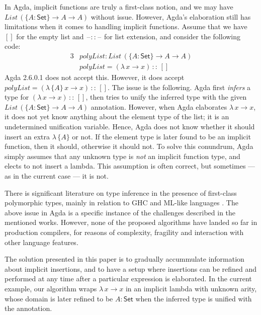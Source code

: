 \documentclass[acmsmall,review,anonymous,prologue,dvipsnames]{acmart}\settopmatter{printfolios=true,printccs=false,printacmref=false}
\newcommand{\blank}{\mathord{\hspace{1pt}\text{--}\hspace{1pt}}}
\newcommand{\kw}[1]{{\mathsf{#1}}}
\theoremstyle{remark}
\begin{document}
In Agda, implicit functions are truly a first-class notion, and we may have
$List\,(\{A : \kw{Set}\}\to A \to A)$ without issue. However, Agda's elaboration
still has limitations when it comes to handling implicit functions. Assume that
we have $[]$ for the empty list and $\blank::\blank$ for list extension,
and consider the following code:
\begin{alignat*}{3}
  & polyList : List\,(\{A : \kw{Set}\}\to A \to A)\\
  & polyList = (\lambda\,x \to x)\,::\,[]
\end{alignat*}
Agda 2.6.0.1 does not accept this. However, it does accept $polyList =
(\lambda\,\{A\}\,x \to x)\,::\,[]$. The issue is the following. Agda first
\emph{infers} a type for $(\lambda\,x \to x)\,::\,[]$, then tries to unify the
inferred type with the given $List\,(\{A : \kw{Set}\}\to A \to A)$
annotation. However, when Agda elaborates $\lambda\,x \to x$, it does not yet
know anything about the element type of the list; it is an undetermined
unification variable. Hence, Agda does not know whether it should insert an
extra $\lambda\,\{A\}$ or not. If the element type is later found to be an
implicit function, then it should, otherwise it should not. To solve this
conundrum, Agda simply assumes that any unknown type is \emph{not} an implicit
function type, and elects to not insert a lambda. This assumption is often
correct, but sometimes --- as in the current case --- it is not.

There is significant literature on type inference in the presence of first-class
polymorphic types, mainly in relation to GHC and ML-like languages \cite{leijen2008hmf,leijen2009flexible,serrano2018guarded,vytiniotis2006boxy}.
The above issue in Agda is a specific instance of the challenges described in
the mentioned works. However, none of the proposed algorithms have landed so far
in production compilers, for reasons of complexity, fragility and interaction
with other language features.

The solution presented in this paper is to gradually accummulate information
about implicit insertions, and to have a setup where insertions can be refined
and performed at any time after a particular expression is elaborated. In the
current example, our algorithm wraps $\lambda\,x\to x$ in an implicit lambda
with unknown arity, whose domain is later refined to be $A : \kw{Set}$ when the
inferred type is unified with the annotation.
\end{document}
